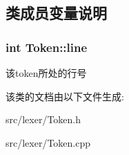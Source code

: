 \subsection{类成员变量说明}
\subsubsection[{\texorpdfstring{line}{line}}]{\setlength{\rightskip}{0pt plus 5cm}int Token\+::line}\hypertarget{class_token_a4b96c2a31d7c374fd2bd1986794f80dd}{}\label{class_token_a4b96c2a31d7c374fd2bd1986794f80dd}
该token所处的行号 

该类的文档由以下文件生成\+:\begin{DoxyCompactItemize}
\item 
src/lexer/Token.\+h\item 
src/lexer/Token.\+cpp\end{DoxyCompactItemize}
